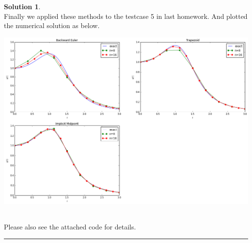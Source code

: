 \documentclass[a4paper, 10pt]{article}
\theoremstyle{definition}
\theoremstyle{hSol}
\newtheorem*{solution}{Solution}
\begin{document}
\begin{solution}
~\\
Finally we applied these methods to the testcase 5 in last homework. And plotted the numerical solution as below.

\begin{center}
\includegraphics[scale=0.42]{hw3_p4.png}
\end{center}

~\\
Please also see the attached code for details.
\end{solution} 
\noindent\rule{16cm}{0.4pt}
\end{document}

